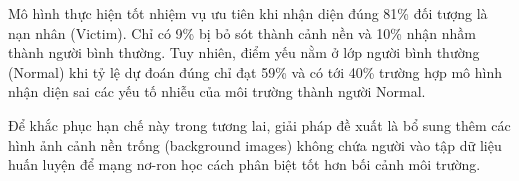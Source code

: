 Mô hình thực hiện tốt nhiệm vụ ưu tiên khi nhận diện đúng 81\% đối tượng là nạn nhân (Victim). Chỉ có 9\% bị bỏ sót thành cảnh nền và 10\% nhận nhầm thành người bình thường. Tuy nhiên, điểm yếu nằm ở lớp người bình thường (Normal) khi tỷ lệ dự đoán đúng chỉ đạt 59\% và có tới 40\% trường hợp mô hình nhận diện sai các yếu tố nhiễu của môi trường thành người Normal. 

Để khắc phục hạn chế này trong tương lai, giải pháp đề xuất là bổ sung thêm các hình ảnh cảnh nền trống (background images) không chứa người vào tập dữ liệu huấn luyện để mạng nơ-ron học cách phân biệt tốt hơn bối cảnh môi trường.


